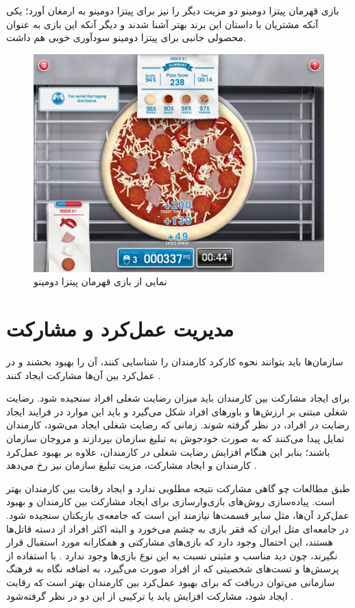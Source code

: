 بازی قهرمان پیتزا دومینو دو مزیت دیگر را نیز برای پیتزا دومینو به ارمغان آورد‌؛ یکی آنکه مشتریان با داستان این برند بهتر آشنا شدند و دیگر آنکه این بازی به عنوان محصولی جانبی برای پیتزا دومینو سودآوری خوبی هم داشت.
\begin{figure}[!htb]
	\centering
	\includegraphics[width=\textwidth]{Figures/domino.png}
	\caption{نمایی از بازی قهرمان پیتزا دومینو \cite{domino}}
\end{figure}

\section{مدیریت عمل‌کرد و مشارکت}
سازمان‌ها باید بتوانند نحوه کارکرد کارمندان را شناسایی کنند، آن را بهبود بخشند و در عمل‌کرد بین آن‌ها مشارکت ایجاد کنند \cite{review}.

برای ایجاد مشارکت بین کارمندان باید میزان رضایت شغلی افراد سنجیده شود. رضایت شغلی مبتنی بر ارزش‌ها و باورهای افراد شکل می‌گیرد و باید این موارد در فرایند ایجاد رضایت در افراد، در نظر گرفته شوند. زمانی که رضایت شغلی ایجاد می‌شود، کارمندان تمایل پیدا می‌کنند که به صورت خودجوش به تبلیغ سازمان بپردازند و مروجان سازمان باشند؛ بنابر این هنگام افزایش رضایت شغلی در کارمندان، علاوه بر بهبود عمل‌کرد کارمندان و ایجاد مشارکت، مزیت تبلیغ سازمان نیز رخ می‌دهد \cite{rezayat}.

طبق مطالعات چو \cite{actionable} گاهی مشارکت نتیجه مطلوبی ندارد و ایجاد رقابت بین کارمندان بهتر است. پیاده‌سازی روش‌های بازی‌وارسازی برای ایجاد مشارکت بین کارمندان و بهبود عمل‌کرد آن‌ها، مثل سایر قسمت‌ها نیازمند این است که جامعه‌ی بازیکنان سنجیده شود. در جامعه‌ای مثل ایران که فقر بازی به چشم می‌خورد و البته اکثر افراد از دسته قاتل‌ها هستند، این احتمال وجود دارد که بازی‌های مشارکتی و همکارانه مورد استقبال قرار نگیرند، چون دید مناسب و مثبتی نسبت به این نوع بازی‌ها وجود ندارد \cite{atoz}. با استفاده از پرسش‌ها و تست‌های شخصیتی که از افراد صورت می‌گیرد، به اضافه نگاه به فرهنگ سازمانی می‌توان دریافت که برای بهبود عمل‌کرد بین کارمندان بهتر است که رقابت ایجاد شود، مشارکت افزایش یابد یا ترکیبی از این دو در نظر گرفته‌شود \cite{reghmosh}.
